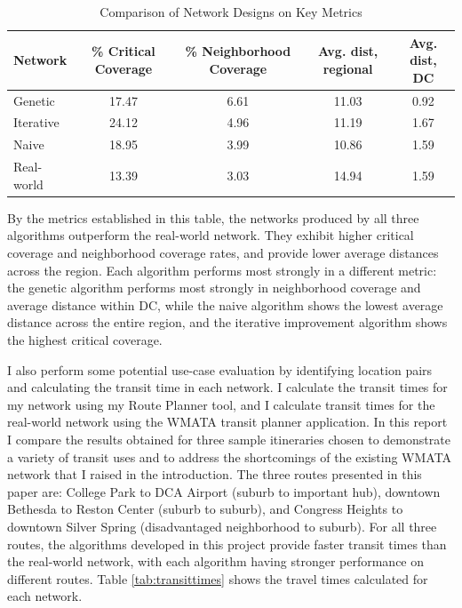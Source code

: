 \documentclass[manuscript,nonacm]{acmart}
\begin{document}
\begin{table}[h]
\caption{Comparison of Network Designs on Key Metrics}
\label{tab:networkmetrics}
\begin{tabular}{lcccc}
\toprule
\textbf{Network} & \textbf{\% Critical Coverage} & \textbf{\% Neighborhood Coverage} & \textbf{Avg. dist, regional} & \textbf{Avg. dist, DC} \\
\midrule
Genetic & 17.47 & 6.61 & 11.03 & 0.92 \\
Iterative & 24.12 & 4.96 & 11.19 & 1.67 \\
Naive & 18.95 & 3.99 & 10.86 & 1.59 \\
\midrule
Real-world & 13.39 & 3.03 & 14.94 & 1.59 \\
\bottomrule
\end{tabular}
\end{table}

By the metrics established in this table, the networks produced by all three algorithms outperform the real-world network. They exhibit higher critical coverage and neighborhood coverage rates, and provide lower average distances across the region. Each algorithm performs most strongly in a different metric: the genetic algorithm performs most strongly in neighborhood coverage and average distance within DC, while the naive algorithm shows the lowest average distance across the entire region, and the iterative improvement algorithm shows the highest critical coverage. 

I also perform some potential use-case evaluation by identifying location pairs and calculating the transit time in each network. I calculate the transit times for my network using my Route Planner tool, and I calculate transit times for the real-world network using the WMATA transit planner application. In this report I compare the results obtained for three sample itineraries chosen to demonstrate a variety of transit uses and to address the shortcomings of the existing WMATA network that I raised in the introduction. The three routes presented in this paper are: College Park to DCA Airport (suburb to important hub), downtown Bethesda to Reston Center (suburb to suburb), and Congress Heights to downtown Silver Spring (disadvantaged neighborhood to suburb). For all three routes, the algorithms developed in this project provide faster transit times than the real-world network, with each algorithm having stronger performance on different routes. Table \ref{tab:transittimes} shows the travel times calculated for each network. 
\end{document}
